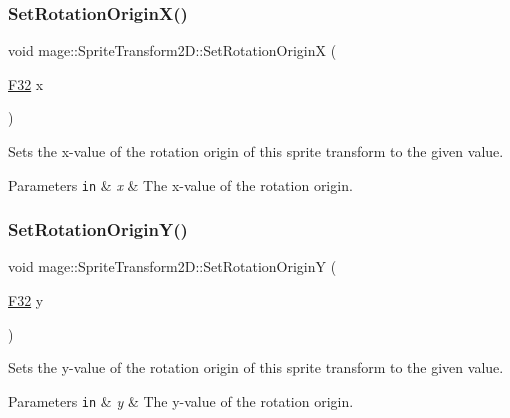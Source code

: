 \subsubsection{\texorpdfstring{Set\+Rotation\+Origin\+X()}{SetRotationOriginX()}}
{\footnotesize\ttfamily void mage\+::\+Sprite\+Transform2\+D\+::\+Set\+Rotation\+OriginX (\begin{DoxyParamCaption}\item[{\mbox{\hyperlink{namespacemage_aa97e833b45f06d60a0a9c4fc22ae02c0}{F32}}}]{x }\end{DoxyParamCaption})\hspace{0.3cm}{\ttfamily [noexcept]}}

Sets the x-\/value of the rotation origin of this sprite transform to the given value.


\begin{DoxyParams}[1]{Parameters}
\mbox{\tt in}  & {\em x} & The x-\/value of the rotation origin. \\
\hline
\end{DoxyParams}
\mbox{\label{classmage_1_1_sprite_transform2_d_a3a4e0919d0ae9423dba081e2ae01c1a2}} 
\subsubsection{\texorpdfstring{Set\+Rotation\+Origin\+Y()}{SetRotationOriginY()}}
{\footnotesize\ttfamily void mage\+::\+Sprite\+Transform2\+D\+::\+Set\+Rotation\+OriginY (\begin{DoxyParamCaption}\item[{\mbox{\hyperlink{namespacemage_aa97e833b45f06d60a0a9c4fc22ae02c0}{F32}}}]{y }\end{DoxyParamCaption})\hspace{0.3cm}{\ttfamily [noexcept]}}

Sets the y-\/value of the rotation origin of this sprite transform to the given value.


\begin{DoxyParams}[1]{Parameters}
\mbox{\tt in}  & {\em y} & The y-\/value of the rotation origin. \\
\hline
\end{DoxyParams}
\mbox{\label{classmage_1_1_sprite_transform2_d_af7835a2436f3a95de5e88a91658b88be}} 

